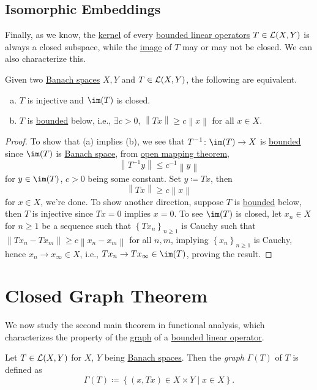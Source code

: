 \subsection{Isomorphic Embeddings}
Finally, as we know, the \hyperref[def:kernel]{kernel} of every \hyperref[def:bounded-linear-op]{bounded linear operators} \(T\in \mathcal{\MakeUppercase{l}} (X, Y)\) is always a closed subspace, while the \hyperref[def:image]{image} of \(T\) may or may not be closed. We can also characterize this.

\begin{proposition}
	Given two \hyperref[def:Banach-space]{Banach spaces} \(X, Y\) and \(T\in \mathcal{\MakeUppercase{l}} (X, Y)\), the following are equivalent.
	\begin{enumerate}[(a)]
		\item \(T\) is injective and \(\im (T)\) is closed.
		\item \(T\) is \hyperref[rmk:bounded-op]{bounded} below, i.e., \(\exists c > 0\), \(\left\lVert Tx\right\rVert \geq c \left\lVert x\right\rVert \) for all \(x\in X\).
	\end{enumerate}
\end{proposition}
\begin{proof}
	To show that (a) implies (b), we see that \(T^{-1} \colon \im(T) \to X\) is \hyperref[rmk:bounded-op]{bounded}  since \(\im(T)\) is \hyperref[def:Banach-space]{Banach space}, from \hyperref[thm:open-mapping]{open mapping theorem},
	\[
		\left\lVert T^{-1} y\right\rVert \leq c^{-1} \left\lVert y\right\rVert
	\]
	for \(y\in \im(T)\), \(c > 0\) being some constant. Set \(y\coloneqq Tx\), then
	\[
		\left\lVert Tx\right\rVert \geq c\left\lVert x\right\rVert
	\]
	for \(x\in X\), we're done. To show another direction, suppose \(T\) is \hyperref[rmk:bounded-op]{bounded} below, then \(T\) is injective since \(Tx= 0\) implies \(x = 0\). To see \(\im(T)\) is closed, let \(x_{n} \in X\) for \(n\geq 1\) be a sequence such that \(\left\{ Tx_n \right\} _{n \geq 1}\) is Cauchy such that \(\left\lVert Tx_n - Tx_m\right\rVert \geq c \left\lVert x_n - x_m\right\rVert \) for all \(n, m\), implying \(\left\{ x_n \right\} _{n\geq 1}\)  is Cauchy, hence \(x_n \to x_\infty \in X\), i.e., \(Tx_n \to Tx_\infty \in \im(T)\), proving the result.
\end{proof}

\section{Closed Graph Theorem}
We now study the second main theorem in functional analysis, which characterizes the property of the \hyperref[def:graph]{graph} of a \hyperref[def:bounded-linear-op]{bounded linear operator}.
\begin{definition}[Graph]\label{def:graph}
	Let \(T\in \mathcal{\MakeUppercase{l}} (X, Y)\) for \(X\), \(Y\) being \hyperref[def:Banach-space]{Banach spaces}. Then the \emph{graph} \(\Gamma (T)\) of \(T\) is defined as
	\[
		\Gamma (T) \coloneqq \left\{ (x, Tx) \in X \times Y\mid x\in X \right\}.
	\]
\end{definition}

